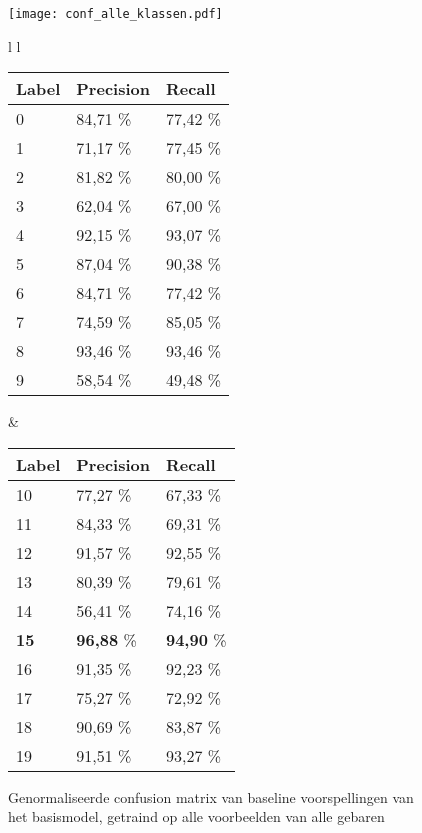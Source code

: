 \begin{figure}
	\centering
	
	\texttt{[image: conf\_alle\_klassen.pdf]}
	\caption{Genormaliseerde confusion matrix van baseline voorspellingen van het basismodel, getraind op alle voorbeelden van alle gebaren }
	\label{fig:conf-allegebaren}

	\vspace{1cm}
	\begin{tabular}{l l}
		\begin{tabular}{l l l}
			\hline
			\textbf{Label} & \textbf{Precision} &
			\textbf{Recall}\\
			\hline
			0 & 84,71 \% & 77,42 \% \\
			1 & 71,17 \% & 77,45 \% \\
			2 & 81,82 \% & 80,00 \% \\
			3 & 62,04 \% & 67,00 \% \\
			4 & 92,15 \% & 93,07 \% \\
			5 & 87,04 \% & 90,38 \% \\
			6 & 84,71 \% & 77,42 \% \\
			7 & 74,59 \% & 85,05 \% \\
			8 & 93,46 \% & 93,46 \% \\
			9 & 58,54 \% & 49,48 \% \\
			\hline
		\end{tabular} & 
		\begin{tabular}{l l l}
			\hline
			\textbf{Label} & \textbf{Precision} &
			\textbf{Recall}\\
			\hline
			10 & 77,27 \% & 67,33 \% \\
			11 & 84,33 \% & 69,31 \% \\
			12 & 91,57 \% & 92,55 \% \\
			13 & 80,39 \% & 79,61 \% \\
			14 & 56,41 \% & 74,16 \% \\
			\textbf{15} & \textbf{96,88} \% & \textbf{94,90} \% \\
			16 & 91,35 \% & 92,23 \% \\
			17 & 75,27 \% & 72,92 \% \\
			18 & 90,69 \% & 83,87 \% \\
			19 & 91,51 \% & 93,27 \% \\
			\hline
		\end{tabular}	
	\end{tabular}
	\label{tab:pr-alle-klassen}
\end{figure}


